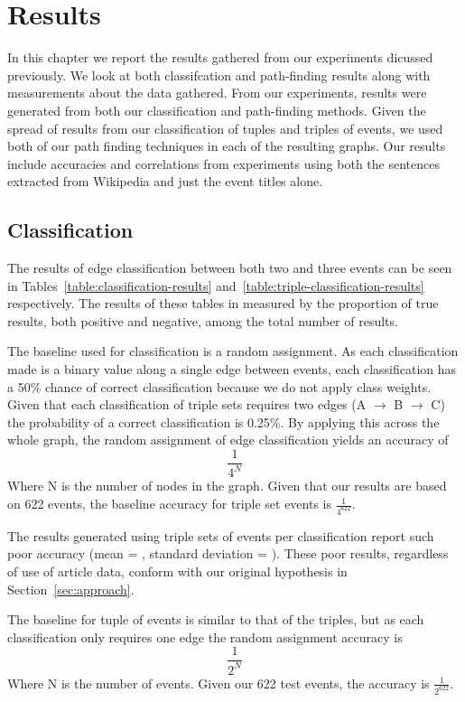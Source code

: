 \documentclass[bsc,frontabs,twoside,singlespacing,parskip,deptreport]{infthesis}     %
\begin{document}
\chapter{Results}\label{chapter:results}
In this chapter we report the results gathered from our experiments dicussed previously.
We look at both classifcation and path-finding results along with measurements about the data gathered.
From our experiments, results were generated from both our classification and path-finding methods.
Given the spread of results from our classification of tuples and triples of events, we used both of our path finding
techniques in each of the resulting graphs. Our results include accuracies and correlations from
experiments using both the sentences extracted from Wikipedia and just the event titles alone.   

\section{Classification}
The results of edge classification between both two and three events can be seen in Tables~\ref{table:classification-results}
and~\ref{table:triple-classification-results} respectively. The results of these tables in measured by the
proportion of true results, both positive and negative, among the total number of results.

The baseline used for classification is a random assignment.
As each classification made is a binary value along a single edge between events, each classification has a
50\% chance of correct classification because we do not apply class weights.
Given that each classification of triple sets requires two edges (A $\rightarrow$ B $\rightarrow$ C) the probability of a correct
classification is 0.25\%. By applying this across the whole graph, the random assignment of edge classification yields an
accuracy of
\begin{equation}
\frac{1}{4^N} \nonumber
\end{equation}
Where N is the number of nodes in the graph.
Given that our results are based on 622 events, the baseline accuracy for triple set events is $\frac{1}{4^{622}}$.

The results generated using triple sets of events per classification report such poor accuracy
(mean = , standard deviation = ). These poor results, regardless of use of article data,
conform with our original hypothesis in Section~\ref{sec:approach}. 


The baseline for tuple of events is similar to that of the triples, but as each classification only requires one edge
the random assignment accuracy is
\begin{equation}
  \frac{1}{2^N}\nonumber
\end{equation}
Where N is the number of events.
Given our 622 test events, the accuracy is $\frac{1}{2^{622}}$.
\end{document}
